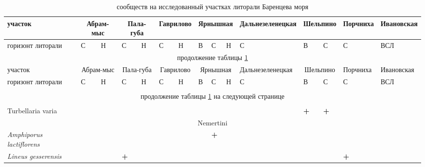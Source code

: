 \begin{footnotesize}
\begin{longtable}{|p{2.1cm}|p{0.38cm}p{0.38cm}|p{0.38cm}p{0.38cm}|p{0.38cm}p{0.38cm}|p{0.35cm}p{0.35cm}p{0.35cm}|p{1cm}|p{0.5cm}p{0.5cm}|p{1cm}|p{1cm}|}
\caption{{ сообществ на исследованный участках литорали Баренцева моря}}
\label{tab:Barents_species}
\\ \hline
участок                     & \multicolumn{2}{c|}{Абрам-мыс} & \multicolumn{2}{c|}{Пала-губа} & \multicolumn{2}{c|}{Гав\-ри\-ло\-во} & \multicolumn{3}{c|}{Яр\-ныш\-ная} & Дальне\-зе\-ле\-нец\-кая & \multicolumn{2}{c|}{Шель\-пи\-но} & Порч\-ни\-ха & Ива\-нов\-ская \\ \hline
горизонт литорали & С       & Н       & С       & Н       & С       & Н   & В    & С    & Н    & С           & В    & С    & С    & ВСЛ        \\ \hline \endfirsthead
	\hline
	\multicolumn{15}{|c|}{продолжение таблицы \ref{tab:Barents_species}} \\ \hline
участок                     & \multicolumn{2}{c|}{Абрам-мыс} & \multicolumn{2}{c|}{Пала-губа} & \multicolumn{2}{c|}{Гав\-ри\-ло\-во} & \multicolumn{3}{c|}{Яр\-ныш\-ная} & Дальне\-зе\-ле\-нец\-кая & \multicolumn{2}{c|}{Шель\-пи\-но} & Порч\-ни\-ха & Ива\-нов\-ская \\ \hline
горизонт литорали & С       & Н       & С       & Н       & С       & Н   & В    & С    & Н    & С           & В    & С    & С    & ВСЛ        \\ \hline
	\\ \hline \endhead
	\hline 
	\multicolumn{15}{|c|}{продолжение таблицы \ref{tab:Barents_species} на следующей странице}
	\\ \hline \endfoot
	 \endlastfoot
\multicolumn{15}{|c|}{Turbellaria} \\ \hline
 Turbellaria varia         &           &           &           &           &           &           &          &          &          &                 & \textbf{+}       & \textbf{+}       &          &            \\ \hline
\multicolumn{15}{|c|}{Nemertini} \\ \hline
{\it Amphiporus lactiflorens}   &           &           &           &           &           &           &          & \textbf{+}       &          &                 &          &          &          &            \\  \hline
{\it Lineus gesserensis}        &           &           & \textbf{+}        &           &           &           &          &          &          &                 &          &          & \textbf{+}       &            \\  \hline

\end{longtable}
\end{footnotesize}
